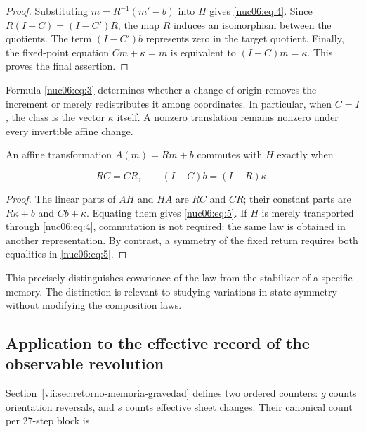 \begin{proof}
Substituting \(m=R^{-1}(m'-b)\) into \(H\) gives \eqref{nuc06:eq:4}. Since \(R(I-C)=(I-C')R\), the map \(R\) induces an isomorphism between the quotients. The term \((I-C')b\) represents zero in the target quotient. Finally, the fixed-point equation \(Cm+\kappa=m\) is equivalent to \((I-C)m=\kappa\). This proves the final assertion.
\end{proof}

Formula \eqref{nuc06:eq:3} determines whether a change of origin removes the increment or merely redistributes it among coordinates. In particular, when \(C=I\), the class is the vector \(\kappa\) itself. A nonzero translation remains nonzero under every invertible affine change.

\begin{proposition}

An affine transformation \(A(m)=Rm+b\) commutes with \(H\) exactly when

\begin{equation}
RC=CR,\qquad (I-C)b=(I-R)\kappa.
\label{nuc06:eq:5}
\end{equation}
\end{proposition}

\begin{proof}
The linear parts of \(AH\) and \(HA\) are \(RC\) and \(CR\); their constant parts are \(R\kappa+b\) and \(Cb+\kappa\). Equating them gives \eqref{nuc06:eq:5}. If \(H\) is merely transported through \eqref{nuc06:eq:4}, commutation is not required: the same law is obtained in another representation. By contrast, a symmetry of the fixed return requires both equalities in \eqref{nuc06:eq:5}.
\end{proof}

This precisely distinguishes covariance of the law from the stabilizer of a specific memory. The distinction is relevant to studying variations in state symmetry without modifying the composition laws.

\subsection{Application to the effective record of the observable revolution}

Section~\ref{vii:sec:retorno-memoria-gravedad} defines two ordered counters: \(g\) counts orientation reversals, and \(s\) counts effective sheet changes. Their canonical count per 27-step block is

